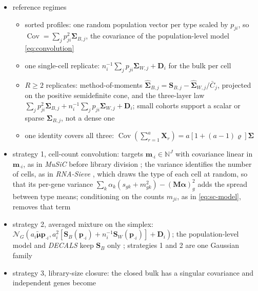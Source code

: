 \begin{itemize}
  \item reference regimes
  \begin{itemize}
    \item sorted profiles: one random population vector per type scaled by \(p_{ji}\), so
          \(\operatorname{Cov}=\sum_{j}p_{ji}^{2}\boldsymbol{\Sigma}_{B,j}\), the covariance of the population-level model
          \eqref{eq:convolution}
    \item one single-cell replicate: \(n_{i}^{-1}\sum_{j}p_{ji}\boldsymbol{\Sigma}_{W,j}+\boldsymbol{D}_{i}\) for the bulk per cell
    \item \(R\ge2\) replicates: method-of-moments \(\hat{\boldsymbol{\Sigma}}_{B,j}=\boldsymbol{S}_{B,j}-\hat{\boldsymbol{\Sigma}}_{W,j}/\bar C_{j}\),
          projected on the positive semidefinite cone, and the three-layer law
          \(\sum_{j}p_{ji}^{2}\boldsymbol{\Sigma}_{B,j}+n_{i}^{-1}\sum_{j}p_{ji}\boldsymbol{\Sigma}_{W,j}+\boldsymbol{D}_{i}\);
          small cohorts support a scalar or sparse \(\boldsymbol{\Sigma}_{B,j}\), not a dense one
    \item one identity covers all three: \(\operatorname{Cov}(\sum_{r=1}^{a}\boldsymbol{X}_{r})=a[1+(a-1)\varrho]\boldsymbol{\Sigma}\)
  \end{itemize}
  \item strategy 1, cell-count convolution: targets \(\boldsymbol{m}_{\cdot i}\in\mathbb{N}^{J}\) with covariance linear in
        \(\boldsymbol{m}_{\cdot i}\), as in \emph{MuSiC} before library division \cite{wangBulkTissueCell2019}; the variance
        identifies the number of cells, as in \emph{RNA-Sieve} \cite{erdmann-phamLikelihoodbasedDeconvolutionBulk2021}, which
        draws the type of each cell at random, so that its per-gene variance
        \(\sum_{k}\alpha_{k}(s_{gk}+m_{gk}^{2})-(\boldsymbol{M}\boldsymbol{\alpha})_{g}^{2}\) adds the spread between type means;
        conditioning on the counts \(m_{ji}\), as in \eqref{eq:sc-model}, removes that term
  \item strategy 2, averaged mixture on the simplex:
        \(\mathcal{N}_{G}(a_{i}\tilde{\boldsymbol{\mu}}\boldsymbol{p}_{\cdot i},a_{i}^{2}[\boldsymbol{S}_{B}(\boldsymbol{p}_{\cdot i})+n_{i}^{-1}\boldsymbol{S}_{W}(\boldsymbol{p}_{\cdot i})]+\boldsymbol{D}_{i})\);
        the population-level model and \emph{DECALS} keep \(\boldsymbol{S}_{B}\) only
        \cite{caiStatisticalInferenceCelltype2024}; strategies 1 and 2 are one Gaussian family
  \item strategy 3, library-size closure: the closed bulk has a singular covariance and independent genes become

\end{itemize}
